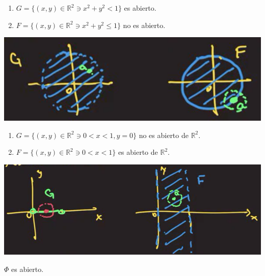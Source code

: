 \begin{ejemplo}
	\begin{enumerate}
		\item $G=\{(x,y)\in\mathbb{R}^2\ni x^2+y^2<1\}$ es abierto. 
		\item $F=\{(x,y)\in \mathbb{R}^2\ni x^2+y^2\leq 1\}$ no es abierto. 
	\end{enumerate}
\begin{center}
	\includegraphics[scale=0.4]{images/2/2}
\end{center}
\end{ejemplo}

\begin{ejemplo}
	\begin{enumerate}
		\item $G=\{(x,y)\in\mathbb{R}^2\ni 0<x<1, y=0\}$ no es abierto de $\mathbb{R}^2$. 
		\item $F=\{(x,y)\in \mathbb{R}^2\ni 0<x<1\}$ es abierto de $\mathbb{R}^2$. 
	\end{enumerate}
	\begin{center}
		\includegraphics[scale=0.4]{images/2/3}
	\end{center}
\end{ejemplo}
\begin{ejemplo}
	$\Phi$ es abierto.
\end{ejemplo}

